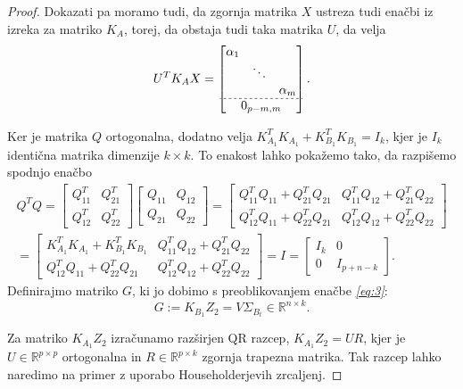 \documentclass[mat1]{article}
\begin{document}
\begin{proof}
Dokazati pa moramo tudi, da zgornja matrika $X$ ustreza tudi enačbi iz izreka za matriko $K_A$, torej, da obstaja tudi taka matrika $U$, da velja
\begin{gather*}
 U^T K_A X = 
\begin{bmatrix}
\begin{matrix}
\alpha_1 & & \\
 & \ddots & \\
 & & \alpha_m
\end{matrix} \\ \hdashline[2pt/2pt]
0_{p-m, m}
\end{bmatrix}
\text{.} 
\end{gather*}

Ker je matrika $Q$ ortogonalna, dodatno velja $K_{A_1}^TK_{A_1} + K_{B_1}^TK_{B_1} = I_k$, kjer je $I_k$ identična matrika dimenzije $k \times k$. To enakost lahko pokažemo tako, da razpišemo spodnjo enačbo
\begin{gather*}
Q^T Q = 
\begin{bmatrix}
Q_{11}^T & Q_{21}^T \\ 
Q_{12}^T & Q_{22}^T
\end{bmatrix}
\begin{bmatrix}
Q_{11} & Q_{12} \\ 
Q_{21} & Q_{22}
\end{bmatrix} =
\begin{bmatrix}
Q_{11}^T Q_{11} + Q_{21}^T Q_{21} & Q_{11}^T Q_{12} + Q_{21}^T Q_{22} \\ 
Q_{12}^T Q_{11} + Q_{22}^T Q_{21} & Q_{12}^T Q_{12} + Q_{22}^T Q_{22}
\end{bmatrix} \\ =
\begin{bmatrix}
K_{A_1}^TK_{A_1} + K_{B_1}^TK_{B_1} & Q_{11}^T Q_{12} + Q_{21}^T Q_{22} \\ 
Q_{12}^T Q_{11} + Q_{22}^T Q_{21} & Q_{12}^T Q_{12} + Q_{22}^T Q_{22}
\end{bmatrix}  = I =
\begin{bmatrix}
I_k & 0\\ 
0 & I_{p+n-k}
\end{bmatrix} \text{.}
\end{gather*}
Definirajmo matriko $G$, ki jo dobimo s preoblikovanjem enačbe \textit{\eqref{eq:3}}:
$$ G := K_{B_1} Z_2 = V \Sigma_{B_t} \in \mathbb{R}^{n \times k} \text{.}
$$

Za matriko $K_{A_1} Z_2$ izračunamo razširjen QR razcep, $ K_{A_1} Z_2 = U R$, kjer je $U \in \mathbb{R}^{p \times p}$ ortogonalna in $R \in \mathbb{R}^{p \times k}$ zgornja trapezna matrika. Tak razcep lahko naredimo na primer z uporabo Householderjevih zrcaljenj.


\end{proof}
\end{document}
